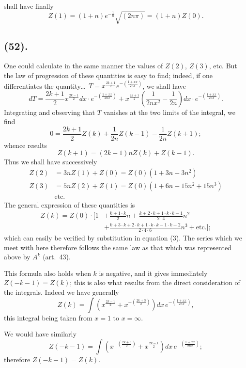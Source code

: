 \documentclass{article}
\begin{document}
shall have finally
\[ Z(1)=(1+n)e^{-\frac{1}{n}}\sqrt{(2n\pi)}=(1+n)Z(0). \tag{2} \]

\subsection*{(52).}

One could calculate in the same manner the values of $Z(2)$, $Z(3)$, etc. But the law of progression of these quantities is easy to find; indeed, if one differentiates the quantity\ldots\ $T=x^{\frac{2k+1}{2}}e^{-\left(\frac{1+xx}{2nx}\right)}$, we shall have
\[ dT=\frac{2k+1}{2}x^{\frac{2k-1}{2}}dx\cdot e^{-\left(\frac{1+xx}{2nx}\right)}+x^{\frac{2k+1}{2}}\left(\frac{1}{2nx^{2}}-\frac{1}{2n}\right)dx\cdot e^{-\left(\frac{1+xx}{2nx}\right)}. \]
Integrating and observing that $T$ vanishes at the two limits of the integral, we find
\[ 0=\frac{2k+1}{2}Z(k)+\frac{1}{2n}Z(k-1)-\frac{1}{2n}Z(k+1); \]
whence results
\[ Z(k+1)=(2k+1)nZ(k)+Z(k-1). \tag{3} \]
Thus we shall have successively
\[ \begin{aligned} Z(2)&=3nZ(1)+Z(0)=Z(0)(1+3n+3n^{2})\\ Z(3)&=5nZ(2)+Z(1)=Z(0)(1+6n+15n^{2}+15n^{3})\\ &\text{etc.} \end{aligned} \]
The general expression of these quantities is
\[ \begin{aligned} Z(k)=Z(0)\cdot\Big[1&+\frac{k+1\cdot k}{2}n+\frac{k+2\cdot k+1\cdot k\cdot k-1}{2\cdot4}n^{2}\\ &+\frac{k+3\cdot k+2\cdot k+1\cdot k\cdot k-1\cdot k-2}{2\cdot4\cdot6}n^{3}+\text{etc.}\Big]; \end{aligned} \tag{4} \]
which can easily be verified by substitution in equation (3). The series which we meet with here therefore follows the same law as that which was represented above by $A^{k}$ (art.\ 43).

This formula also holds when $k$ is negative, and it gives immediately $Z(-k-1)=Z(k)$; this is also what results from the direct consideration of the integrals. Indeed we have generally
\[ Z(k)=\int\left(x^{\frac{2k-1}{2}}+x^{-\left(\frac{2k+3}{2}\right)}\right)dx\,e^{-\left(\frac{1+xx}{2nx}\right)}, \]
this integral being taken from $x=1$ to $x=\infty$.


We would have similarly
\[ Z(-k-1)=\int\left(x^{-\left(\frac{2k+3}{2}\right)}+x^{\frac{2k-1}{2}}\right)dx\,e^{-\left(\frac{1+xx}{2nx}\right)}; \]
therefore $Z(-k-1)=Z(k)$.
\end{document}

